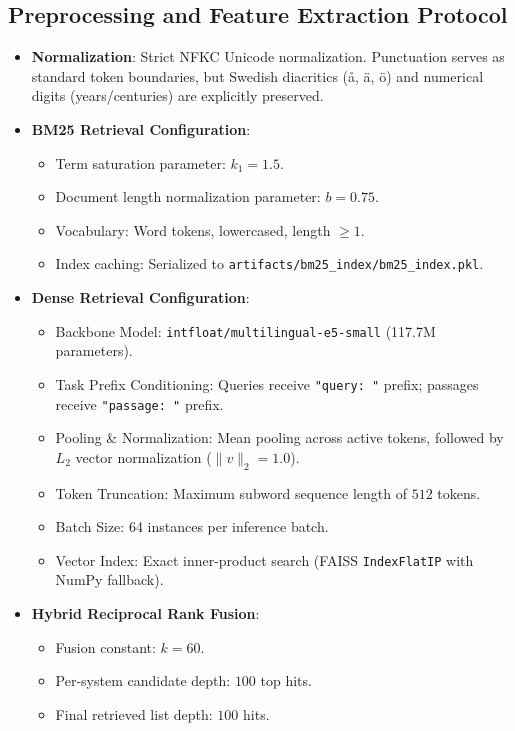 \subsection{Preprocessing and Feature Extraction Protocol}
\begin{itemize}
    \item \textbf{Normalization}: Strict NFKC Unicode normalization. Punctuation serves as standard token boundaries, but Swedish diacritics (\aa, \"a, \"o) and numerical digits (years/centuries) are explicitly preserved.
    \item \textbf{BM25 Retrieval Configuration}:
    \begin{itemize}
        \item Term saturation parameter: $k_1 = 1.5$.
        \item Document length normalization parameter: $b = 0.75$.
        \item Vocabulary: Word tokens, lowercased, length $\ge 1$.
        \item Index caching: Serialized to \texttt{artifacts/bm25\_index/bm25\_index.pkl}.
    \end{itemize}
    \item \textbf{Dense Retrieval Configuration}:
    \begin{itemize}
        \item Backbone Model: \texttt{intfloat/multilingual-e5-small} (117.7M parameters).
        \item Task Prefix Conditioning: Queries receive \texttt{"query: "} prefix; passages receive \texttt{"passage: "} prefix.
        \item Pooling \& Normalization: Mean pooling across active tokens, followed by $L_2$ vector normalization ($\|v\|_2 = 1.0$).
        \item Token Truncation: Maximum subword sequence length of $512$ tokens.
        \item Batch Size: 64 instances per inference batch.
        \item Vector Index: Exact inner-product search (FAISS \texttt{IndexFlatIP} with NumPy fallback).
    \end{itemize}
    \item \textbf{Hybrid Reciprocal Rank Fusion}:
    \begin{itemize}
        \item Fusion constant: $k = 60$.
        \item Per-system candidate depth: $100$ top hits.
        \item Final retrieved list depth: $100$ hits.
    \end{itemize}
\end{itemize}

